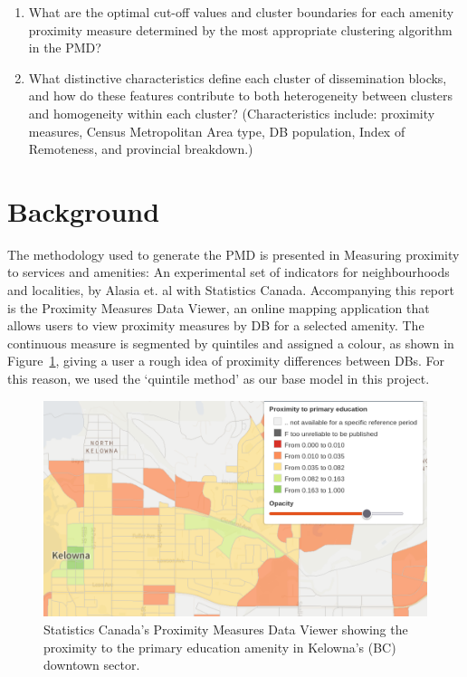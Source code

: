 \documentclass[11pt, a4paper]{article}
\begin{document}
\begin{enumerate}
\item What are the optimal cut-off values and cluster boundaries for each amenity proximity measure determined by the most appropriate clustering algorithm in the PMD?
\item What distinctive characteristics define each cluster of dissemination blocks, and how do these features contribute to both heterogeneity between clusters and homogeneity within each cluster? (Characteristics include: proximity measures, Census Metropolitan Area type, DB population, Index of Remoteness, and provincial breakdown.) 
\end{enumerate}









\pagebreak 
\section{Background}


The methodology used to generate the PMD is presented in Measuring proximity to services and amenities: An experimental set of indicators for neighbourhoods and localities, by Alasia et. al with Statistics Canada. Accompanying this report is the Proximity Measures Data Viewer, an online mapping application that allows users to view proximity measures by DB for a selected amenity. The continuous measure is segmented by quintiles and assigned a colour, as shown in Figure~\ref{pmdviewer}, giving a user a rough idea of proximity differences between DBs. For this reason, we used the `quintile method' as our base model in this project.


\begin{figure}[H]
\centering
\includegraphics[width=\textwidth]{./PMD_viewer/PMD_viewer.png}
\caption[Proximity Measures Data Viewer]{Statistics Canada’s Proximity Measures Data Viewer showing the proximity to the primary education amenity in Kelowna’s (BC) downtown sector.}\label{pmdviewer}
\end{figure}
\end{document}
